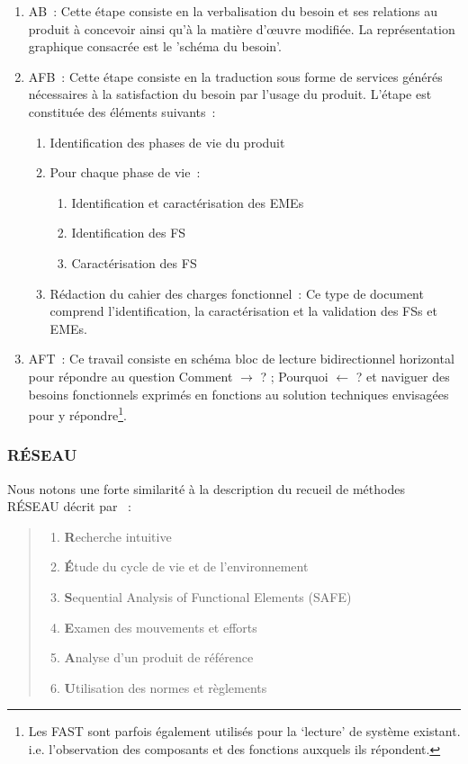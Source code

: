 \begin{enumerate}
\item \gls{AB}~:
Cette étape consiste en la verbalisation du besoin et ses relations au produit à concevoir ainsi qu'à la matière d’œuvre modifiée. La représentation graphique consacrée est le 'schéma du besoin'.
\item \gls{AFB}~:
Cette étape consiste en la traduction sous forme de services générés nécessaires à la satisfaction du besoin par l'usage du produit.
L'étape est constituée des éléments suivants~:
	\begin{enumerate}
	\item Identification des phases de vie du produit
	\item Pour chaque phase de vie~: 
		\begin{enumerate}
		\item Identification et caractérisation des \glspl{EME} 
		\item Identification des \gls{FS} 
		\item Caractérisation des \gls{FS}
		\end{enumerate}
	\item Rédaction du cahier des charges fonctionnel~: Ce type de document comprend l'identification, la caractérisation et la validation des \glspl{FS} et \glspl{EME}.
	\end{enumerate}
\item \gls{AFT}~: Ce travail consiste en schéma bloc de lecture bidirectionnel horizontal pour répondre au question Comment $\rightarrow$ ? ; Pourquoi $\leftarrow$ ? et naviguer des besoins fonctionnels exprimés en fonctions au solution techniques envisagées pour y répondre\footnote{Les FAST sont parfois également utilisés pour la `lecture' de système existant. i.e. l'observation des composants et des fonctions auxquels ils répondent.}.
\end{enumerate}

\subsubsection{RÉSEAU}
\label{subsubsec:RÉSEAU}

Nous notons une forte similarité à la description du recueil de méthodes RÉSEAU décrit par \citeauthor{tassinari_pratique_1997}~:
\blockcquote[Méthode RÉSEAU (11)]{tassinari_pratique_1997}{
\begin{enumerate}
\item \textbf{R}echerche intuitive
\item \textbf{É}tude du cycle de vie et de l'environnement
\item \textbf{S}equential Analysis of Functional Elements (SAFE)
\item \textbf{E}xamen des mouvements et efforts
\item \textbf{A}nalyse d'un produit de référence
\item \textbf{U}tilisation des normes et règlements
\end{enumerate}
}

